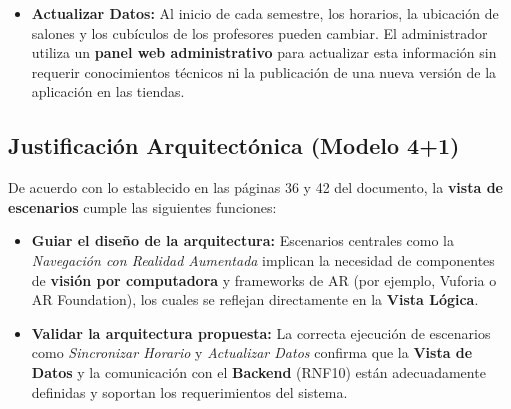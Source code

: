 \begin{flushleft}
	\begin{itemize}
		\item \textbf{Actualizar Datos:}  
		Al inicio de cada semestre, los horarios, la ubicación de salones y los cubículos de los profesores pueden cambiar. El administrador utiliza un \textbf{panel web administrativo} para actualizar esta información sin requerir conocimientos técnicos ni la publicación de una nueva versión de la aplicación en las tiendas.
	\end{itemize}
	
	\subsection*{Justificación Arquitectónica (Modelo 4+1)}
	
	De acuerdo con lo establecido en las páginas 36 y 42 del documento, la \textbf{vista de escenarios} cumple las siguientes funciones:
	
	\begin{itemize}
		\item \textbf{Guiar el diseño de la arquitectura:}  
		Escenarios centrales como la \textit{Navegación con Realidad Aumentada} implican la necesidad de componentes de \textbf{visión por computadora} y frameworks de AR (por ejemplo, Vuforia o AR Foundation), los cuales se reflejan directamente en la \textbf{Vista Lógica}.
		
		\item \textbf{Validar la arquitectura propuesta:}  
		La correcta ejecución de escenarios como \textit{Sincronizar Horario} y \textit{Actualizar Datos} confirma que la \textbf{Vista de Datos} y la comunicación con el \textbf{Backend} (RNF10) están adecuadamente definidas y soportan los requerimientos del sistema.
	\end{itemize}
	

\end{flushleft}